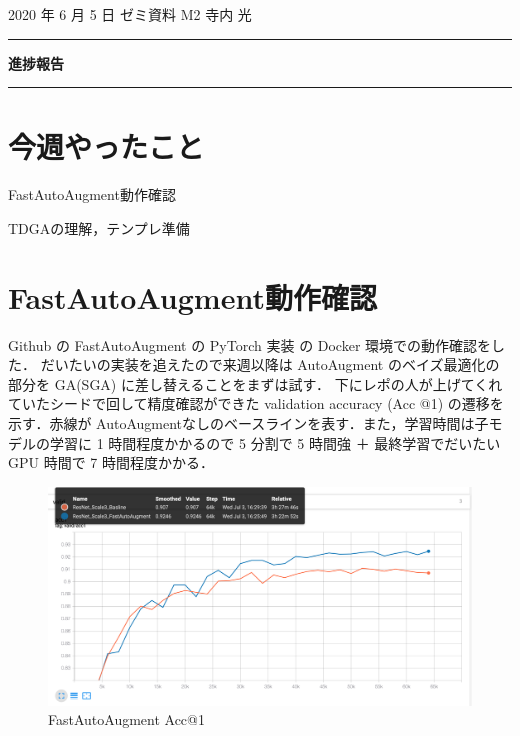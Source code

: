 \documentclass[onecolumn]{ujarticle}   %
\begin{document}
	\noindent

	\hspace{1em}
	2020 年 6 月 5 日
	ゼミ資料
	\hfill
	M2 寺内 光

	\vspace{2mm}

	\hrule

	\begin{center}
		{\Large \bf 進捗報告}
	\end{center}

	\hrule
	\vspace{3mm}

	\section{今週やったこと}
	\begin{itemize}{
		\item{FastAutoAugment動作確認}
		\item{TDGAの理解，テンプレ準備}
	}\end{itemize}

	\section{FastAutoAugment動作確認}
	Github の FastAutoAugment の PyTorch 実装 \cite{fastautoaugument} の Docker 環境での動作確認をした．
	だいたいの実装を追えたので来週以降は AutoAugment のベイズ最適化の部分を GA(SGA) に差し替えることをまずは試す．
	下にレポの人が上げてくれていたシードで回して精度確認ができた validation accuracy (Acc @1) の遷移を示す．赤線が AutoAugmentなしのベースラインを表す．また，学習時間は子モデルの学習に 1 時間程度かかるので 5 分割で 5 時間強 ＋ 最終学習でだいたい GPU 時間で 7 時間程度かかる．

	\begin{figure}[h]
		\begin{center}
			\includegraphics[width=\columnwidth]{resnet20_valid.png}
			\caption{FastAutoAugment Acc@1}
			\label{fig:FasetAutoAugment-accuracy}
		\end{center}
	\end{figure}
\end{document}
